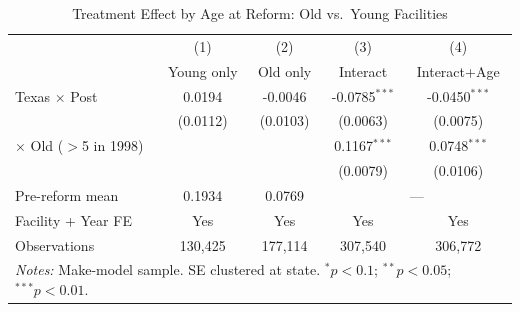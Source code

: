 \begin{table}[htbp]\centering
\caption{Treatment Effect by Age at Reform: Old vs.\ Young Facilities}
\label{tbl:old_young_did}
\begin{tabular}{lcccc}\toprule
 & (1) & (2) & (3) & (4) \\
 & Young only & Old only & Interact & Interact+Age \\\midrule
Texas $\times$ Post & 0.0194 & -0.0046 & -0.0785$^{***}$ & -0.0450$^{***}$ \\
 & (0.0112) & (0.0103) & (0.0063) & (0.0075) \\
$\times$ Old ($>$5 in 1998) & & & 0.1167$^{***}$ & 0.0748$^{***}$ \\
 & & & (0.0079) & (0.0106) \\
\midrule
Pre-reform mean & 0.1934 & 0.0769 & \multicolumn{2}{c}{---} \\
Facility + Year FE & Yes & Yes & Yes & Yes \\\midrule
Observations & 130,425 & 177,114 & 307,540 & 306,772 \\
\bottomrule
\multicolumn{5}{p{0.95\textwidth}}{\footnotesize \textit{Notes:} 
Make-model sample. SE clustered at state. 
$^{*}p<0.1$; $^{**}p<0.05$; $^{***}p<0.01$.}
\end{tabular}\end{table}
